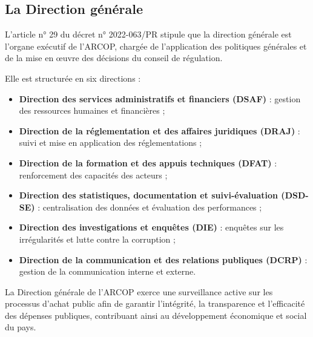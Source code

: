 \subsection{La Direction générale}
L’article n° 29 du décret n° 2022-063/PR stipule que la direction générale est l'organe exécutif de l’\ac{ARCOP}, chargée de l’application des politiques générales et de la mise en œuvre des décisions du conseil de régulation.

Elle est structurée en six directions :
\begin{itemize}
    \item \textbf{Direction des services administratifs et financiers (DSAF)} : gestion des ressources humaines et financières ;
    \item \textbf{Direction de la réglementation et des affaires juridiques (DRAJ)} : suivi et mise en application des réglementations ;
    \item \textbf{Direction de la formation et des appuis techniques (DFAT)} : renforcement des capacités des acteurs ;
    \item \textbf{Direction des statistiques, documentation et suivi-évaluation (DSD-SE)} : centralisation des données et évaluation des performances ;
    \item \textbf{Direction des investigations et enquêtes (DIE)} : enquêtes sur les irrégularités et lutte contre la corruption ;
    \item \textbf{Direction de la communication et des relations publiques (DCRP)} : gestion de la communication interne et externe.
\end{itemize}

La Direction générale de l’\ac{ARCOP} exerce une surveillance active sur les processus d'achat public afin de garantir l'intégrité, la transparence et l'efficacité des dépenses publiques, contribuant ainsi au développement économique et social du pays.



\clearpage